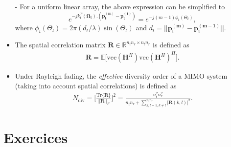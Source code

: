 \documentclass [a4paper, 11pt] {article}
\begin{document}
\begin{reminder}
\begin{itemize}
\begin{equation}
    \end{equation}
    \item[-] For a uniform linear array, the above expression can be simplified to
    \begin{equation}
    e^{-jk_t^T(\mathbf{\Omega_t}).(\mathbf{p^{(m)}_t} - \mathbf{p^{(1)}_t})} = e^{-j(m-1)\phi_t(\Theta_t)},
    \end{equation}
    where $\phi_t(\Theta_t) = 2\pi(d_t/\lambda)\sin(\Theta_t)$ and $d_t = ||\mathbf{p_t^{(m)}} - \mathbf{p_t^{(m-1)}}||$. 
    \item The spatial correlation matrix $\mathbf{R} \in \mathbb{R}^{n_tn_r \times n_tn_r}$ is defined as 
    \begin{align}
        \mathbf{R} = \mathbb{E}\Big[\text{vec}(\mathbf{H}^H)\text{vec}(\mathbf{H}^H)^H \Big].
    \end{align}
    \item Under Rayleigh fading, the \textit{effective} diversity order of a MIMO system (taking into account spatial correlations) is defined as 
    \begin{align}
        N_{\text{div}} = \Bigg[ \frac{\text{Tr}\{\mathbf{R}\}}{||\mathbf{R}||_F}\Bigg]^2 = \frac{n_t^2n_r^2}{n_t n_r + \sum_{k,l=1,k \neq l}^{n_tn_r} |\mathbf{R}(k,l)|^2}.
    \end{align}
    
    
    
\end{itemize}
    \end{reminder}
    \part*{Exercices}
    
\end{document}
